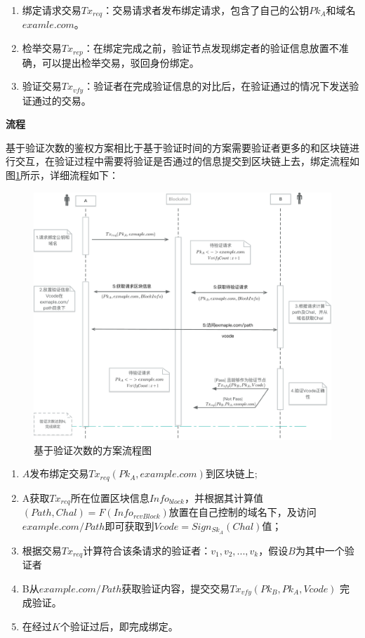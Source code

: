 \begin{enumerate}
	\item 绑定请求交易$Tx_{req}$：交易请求者发布绑定请求，包含了自己的公钥$Pk_A$和域名$examle.com$。
	\item 检举交易$Tx_{rep}$：在绑定完成之前，验证节点发现绑定者的验证信息放置不准确，可以提出检举交易，驳回身份绑定。
	\item 验证交易$Tx_{vfy}$：验证者在完成验证信息的对比后，在验证通过的情况下发送验证通过的交易。
\end{enumerate}

\noindent\textbf{流程}

基于验证次数的鉴权方案相比于基于验证时间的方案需要验证者更多的和区块链进行交互，在验证过程中需要将验证是否通过的信息提交到区块链上去，绑定流程如图\ref{fig:count_based_workflow}所示，详细流程如下：

\begin{figure}[htbp]
 	\centering
 	\includegraphics[width = 1\textwidth]{img/count_based_workflow}
 	\caption{基于验证次数的方案流程图}\label{fig:count_based_workflow}
\end{figure}

\begin{enumerate}
	\item $A$发布绑定交易$Tx_{req}(Pk_A, example.com)$到区块链上;
	\item  A获取$Tx_{req}$所在位置区块信息$Info_{block}$，并根据其计算值$(Path, Chal) = F(Info_{rcvBlock})$放置在自己控制的域名下，及访问$example.com/Path$即可获取到$Vcode = Sign_{Sk_A}(Chal)$值；
	\item 根据交易$Tx_{req}$计算符合该条请求的验证者：${v_1, v_2, ... , v_k}$，假设$B$为其中一个验证者
	\item B从$example.com/Path$获取验证内容，提交交易$Tx_{vfy}(Pk_B, Pk_A, Vcode)$ 完成验证。
	\item 在经过$K$个验证过后，即完成绑定。
\end{enumerate}

